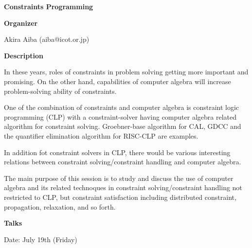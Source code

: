 \begin{center}
{\LARGE \bf Constraints Programming
}
\end{center}
\bigskip

\noindent
{\bf Organizer}

\medskip

Akira Aiba (aiba@icot.or.jp)

\bigskip

\noindent
{\bf Description}
\medskip

In these years, roles of constraints in problem solving getting more important and promising. On
the other hand, capabilities of computer algebra will increase problem-solving ability of
constraints. 

One of the combination of constraints and computer algebra is constraint logic programming
(CLP) with a constraint-solver having computer algebra related algorithm for constraint solving.
Groebner-base algorithm for CAL, GDCC and the quantifier elimination algorithm for
RISC-CLP are examples. 

In addition fot constraint solvers in CLP, there would be various interesting relations between
constraint solving/constraint handling and computer algebra. 

The main purpose of this session is to study and discuss the use of computer algebra and its related
technoques in constraint solving/constraint handling not restricted to CLP, but constraint
satisfaction including distributed constraint, propagation, relaxation, and so forth. 

\bigskip
\noindent
{\bf Talks}
\medskip

Date: July 19th (Friday) 

